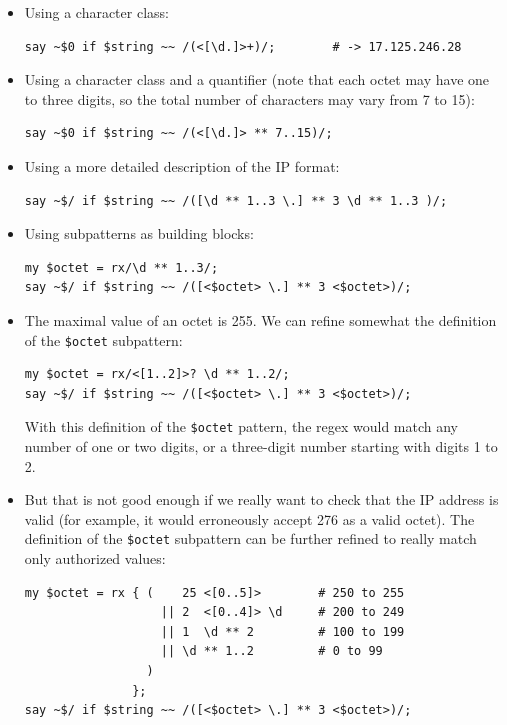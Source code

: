 \begin{itemize}     

\item Using a character class:

\begin{verbatim}
say ~$0 if $string ~~ /(<[\d.]>+)/;        # -> 17.125.246.28
\end{verbatim}
%

\item Using a character class and a quantifier (note that 
each octet may have one to three digits, so the total number 
of characters may vary from 7 to 15):

\begin{verbatim}
say ~$0 if $string ~~ /(<[\d.]> ** 7..15)/;  
\end{verbatim}
%

\item Using a more detailed description of the IP format:
\begin{verbatim}
say ~$/ if $string ~~ /([\d ** 1..3 \.] ** 3 \d ** 1..3 )/;
\end{verbatim}
%

\item Using subpatterns as building blocks:
\begin{verbatim}
my $octet = rx/\d ** 1..3/;
say ~$/ if $string ~~ /([<$octet> \.] ** 3 <$octet>)/;
\end{verbatim}
%

\item The maximal value of an octet is 255. We can 
refine somewhat the definition of the \verb'$octet' 
subpattern:
\begin{verbatim}
my $octet = rx/<[1..2]>? \d ** 1..2/;
say ~$/ if $string ~~ /([<$octet> \.] ** 3 <$octet>)/;
\end{verbatim}
%
With this definition of the \verb'$octet' pattern, the 
regex would match any number of one or two digits, or a 
three-digit number starting with digits 1 to 2.

\item But that is not good enough if we really want to check 
that the IP address is valid (for example, it would erroneously 
accept 276 as a valid octet). The definition of the 
\verb'$octet' subpattern can be further refined to 
really match only authorized values:

\begin{verbatim}
my $octet = rx { (    25 <[0..5]>        # 250 to 255
                   || 2  <[0..4]> \d     # 200 to 249
                   || 1  \d ** 2         # 100 to 199
                   || \d ** 1..2         # 0 to 99 
                 )
               };
say ~$/ if $string ~~ /([<$octet> \.] ** 3 <$octet>)/;
\end{verbatim}
%


\end{itemize}
